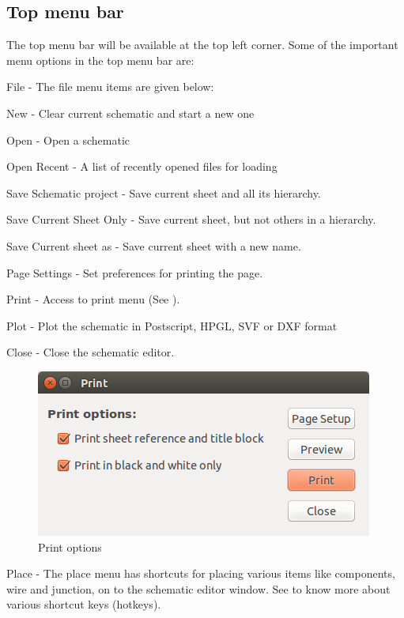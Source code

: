\subsection{Top menu bar}
The top menu bar will be available at the top left corner.
Some of the important menu options in the top menu bar are:

\begin{compactenum}
\item File - 
The file menu items are given below:
\begin{compactenum}
\item New - Clear current schematic and start a new one
\item Open - Open a schematic 
\item Open Recent - A list of recently opened files for loading
\item Save Schematic project - Save current sheet and all its
  hierarchy.
\item Save Current Sheet Only - Save current sheet, but not others in
  a hierarchy.
\item Save Current sheet as - Save current sheet with a new name.
\item Page Settings - Set preferences for printing the page.
\item Print - Access to print menu (See ).
\item Plot - Plot the schematic in Postscript, HPGL, SVF or DXF format 
\item Close - Close the schematic editor. 
\end{compactenum}
\begin{figure}[h]
\begin{center}
\includegraphics[width=0.5\linewidth]{manual_images/print.png}
\caption{Print options}
\label{print}
\end{center}
\end{figure}

\item Place - 
The place menu has shortcuts for placing various items like
components, wire and junction, on to the schematic editor window. See
 to know more about various shortcut keys (hotkeys). 


\end{compactenum}
